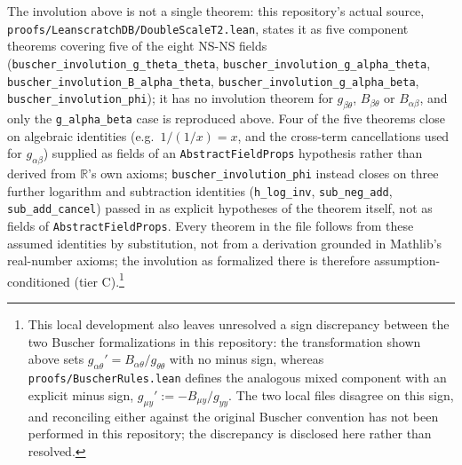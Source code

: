 \documentclass[11pt,a4paper]{article}
\begin{document}
The involution above is not a single theorem: this repository's actual source, \texttt{proofs/LeanscratchDB/DoubleScaleT2.lean}, states it as five component theorems covering five of the eight NS-NS fields (\texttt{buscher\_involution\_g\_theta\_theta}, \texttt{buscher\_involution\_g\_alpha\_theta}, \texttt{buscher\_involution\_B\_alpha\_theta}, \texttt{buscher\_involution\_g\_alpha\_beta}, \texttt{buscher\_involution\_phi}); it has no involution theorem for $g_{\beta\theta}$, $B_{\beta\theta}$ or $B_{\alpha\beta}$, and only the \texttt{g\_alpha\_beta} case is reproduced above. Four of the five theorems close on algebraic identities (e.g.\ $1/(1/x)=x$, and the cross-term cancellations used for $g_{\alpha\beta}$) supplied as fields of an \texttt{AbstractFieldProps} hypothesis rather than derived from $\mathbb{R}$'s own axioms; \texttt{buscher\_involution\_phi} instead closes on three further logarithm and subtraction identities (\texttt{h\_log\_inv}, \texttt{sub\_neg\_add}, \texttt{sub\_add\_cancel}) passed in as explicit hypotheses of the theorem itself, not as fields of \texttt{AbstractFieldProps}. Every theorem in the file follows from these assumed identities by substitution, not from a derivation grounded in Mathlib's real-number axioms; the involution as formalized there is therefore assumption-conditioned (tier C).\footnote{This local development also leaves unresolved a sign discrepancy between the two Buscher formalizations in this repository: the transformation shown above sets $g_{\alpha\theta}' = B_{\alpha\theta}/g_{\theta\theta}$ with no minus sign, whereas \texttt{proofs/BuscherRules.lean} defines the analogous mixed component with an explicit minus sign, $g_{\mu y}' := -B_{\mu y}/g_{yy}$. The two local files disagree on this sign, and reconciling either against the original Buscher convention has not been performed in this repository; the discrepancy is disclosed here rather than resolved.}
\end{document}

